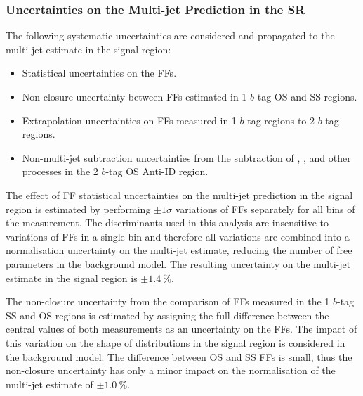 \subsubsection{Uncertainties on the Multi-jet Prediction in the \hadhad SR}

%

The following systematic uncertainties are considered and propagated to the
multi-jet estimate in the \hadhad signal region:
\begin{itemize}

\item Statistical uncertainties on the FFs.

\item Non-closure uncertainty between FFs estimated in 1 $b$-tag OS and SS
  regions.

\item Extrapolation uncertainties on FFs measured in 1 $b$-tag regions to 2
  $b$-tag regions.

\item Non-multi-jet subtraction uncertainties from the subtraction of \ttbar,
  \ttbarFakes, and other processes in the 2 $b$-tag OS Anti-ID region.

\end{itemize}

The effect of FF statistical uncertainties on the multi-jet prediction in the
signal region is estimated by performing $\pm 1 \sigma$ variations of FFs
separately for all bins of the measurement. The discriminants used in this
analysis are insensitive to variations of FFs in a single bin and therefore all
variations are combined into a normalisation uncertainty on the multi-jet
estimate, reducing the number of free parameters in the background model. The
resulting uncertainty on the multi-jet estimate in the signal region is
$\pm \SI{1.4}{\percent}$.

The non-closure uncertainty from the comparison of FFs measured in the 1 $b$-tag
SS and OS regions is estimated by assigning the full difference between the
central values of both measurements as an uncertainty on the FFs. The impact of
this variation on the shape of distributions in the signal region is considered
in the background model. The difference between OS and SS FFs is small, thus the
non-closure uncertainty has only a minor impact on the normalisation of the
multi-jet estimate of $\pm \SI{1.0}{\percent}$.

